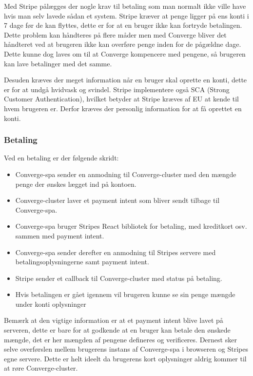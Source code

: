 Med Stripe pålægges der nogle krav til betaling som man normalt ikke ville have hvis man selv lavede sådan et system. Stripe kræver at penge ligger på ens konti i 7 dage før de kan flyttes, dette er for at en bruger ikke kan fortryde betalingen. Dette problem kan håndteres på flere måder men med Converge bliver det håndteret ved at brugeren ikke kan overføre penge inden for de pågældne dage. Dette kunne dog laves om til at Converge kompencere med pengene, så brugeren kan lave betalinger med det samme.

Desuden kræves der meget information når en bruger skal oprette en konti, dette er for at undgå hvidvask og svindel. Stripe implementere også SCA (Strong Customer Authentication), hvilket betyder at Stripe kræves af EU at kende til hvem brugeren er. Derfor kræves der personlig information for at få oprettet en konti.

\subsubsection{Betaling}

Ved en betaling er der følgende skridt:

\begin{itemize}
    \item Converge-spa sender en anmodning til Converge-cluster med den mængde penge der ønskes lægget ind på kontoen.
    \item Converge-cluster laver et payment intent som bliver sendt tilbage til Converge-spa.
    \item Converge-spa bruger Stripes React bibliotek for betaling, med kreditkort osv. sammen med payment intent.
    \item Converge-spa sender derefter en anmodning til Stripes servere med betalingsoplysningerne samt payment intent.
    \item Stripe sender et callback til Converge-cluster med status på betaling.
    \item Hvis betalingen er gået igennem vil brugeren kunne se sin penge mængde under konti oplysninger
\end{itemize}

Bemærk at den vigtige information er at et payment intent blive lavet på serveren, dette er bare for at godkende at en bruger kan betale den ønskede mængde, det er her mængden af pengene defineres og verificeres. Dernest sker selve overførslen mellem brugerens instans af Converge-spa i browseren og Stripes egne servere. Dette er helt ideelt da brugerens kort oplysninger aldrig kommer til at røre Converge-cluster.

